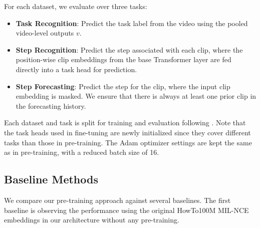 For each dataset, we evaluate over three tasks:
\begin{itemize}
    \item \textbf{Task Recognition}: Predict the task label from the video using the pooled video-level outputs $v$.
    \item \textbf{Step Recognition}: Predict the step associated with each clip, where the position-wise clip embeddings from the base Transformer layer are fed directly into a task head for prediction.
    \item \textbf{Step Forecasting}: Predict the step for the clip, where the input clip embedding is masked. We ensure that there is always at least one prior clip in the forecasting history.
\end{itemize}   

Each dataset and task is split for training and evaluation following \cite{paprika}. Note that the task heads used in fine-tuning are newly initialized since they cover different tasks than those in pre-training. The Adam optimizer settings are kept the same as in pre-training, with a reduced batch size of 16.



\subsection{Baseline Methods}

We compare our pre-training approach against several baselines. The first baseline is observing the performance using the original HowTo100M MIL-NCE embeddings \citep{miech19howto100m} in our architecture without any pre-training. 

